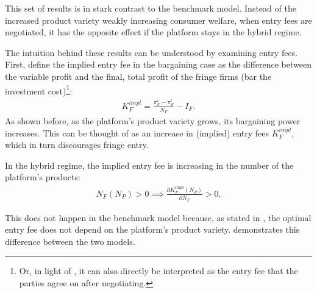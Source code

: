 This set of results is in stark contrast to the benchmark model.
Instead of the increased product variety weakly increasing consumer welfare, when entry fees are negotiated, it has the opposite effect if the platform stays in the hybrid regime.

The intuition behind these results can be understood by examining entry fees.
First, define the implied entry fee in the bargaining case as the difference between the variable profit and the final, total profit of the fringe firms (bar the investment cost)\footnote{
    Or, in light of , it can also directly be interpreted as the entry fee that the parties agree on after negotiating.
}:
\begin{align*}
    K_F^{impl} = \frac{\pi_F^v - \pi_F^t}{N_F} - I_F.
\end{align*}
As shown before, as the platform's product variety grows, its bargaining power increases.
This can be thought of as an increase in (implied) entry fees $K_F^{impl}$, which in turn discourages fringe entry.
\begin{proposition}
    \label{prop:implied_entry_fee_comparative}
    In the hybrid regime, the implied entry fee is increasing in the number of the platform's products:
    \begin{align*}
        N_F(N_P) > 0 \implies \frac{\partial K_F^{impl}(N_P)}{\partial N_P} > 0.
    \end{align*}
\end{proposition}
This does not happen in the benchmark model because, as stated in , the optimal entry fee does not depend on the platform's product variety.
 demonstrates this difference between the two models.

